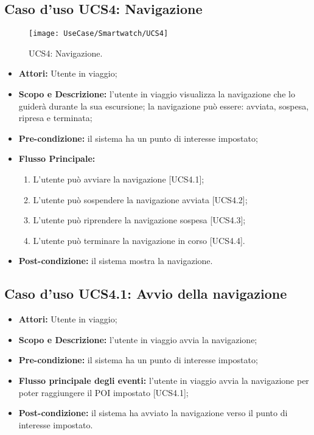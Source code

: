 \subsection{Caso d'uso UCS4: Navigazione}

\begin{figure}[H]
\centering
\texttt{[image: UseCase/Smartwatch/UCS4]}
\caption{UCS4: Navigazione.}
\end{figure}

\begin{itemize}
\item \textbf{Attori:} Utente in viaggio;
\item \textbf{Scopo e Descrizione:} l'utente in viaggio visualizza la navigazione che lo guiderà durante la sua escursione; la navigazione può essere: avviata, sospesa, ripresa e terminata;
\item \textbf{Pre-condizione:} il sistema ha un punto di interesse impostato;
\item \textbf{Flusso Principale:} 
\begin{enumerate}
\item L'utente può avviare la navigazione [UCS4.1];
\item L'utente può sospendere la navigazione avviata [UCS4.2];
\item L'utente può riprendere la navigazione sospesa [UCS4.3];
\item L'utente può terminare la navigazione in corso [UCS4.4].
\end{enumerate}
\item \textbf{Post-condizione:} il sistema mostra la navigazione.
\end{itemize}

\subsection{Caso d'uso UCS4.1: Avvio della navigazione}
\begin{itemize}
\item \textbf{Attori:} Utente in viaggio;
\item \textbf{Scopo e Descrizione:} l'utente in viaggio avvia la navigazione;
\item \textbf{Pre-condizione:} il sistema ha un punto di interesse impostato;
\item \textbf{Flusso principale degli eventi:} l'utente in viaggio avvia la navigazione per poter raggiungere il POI impostato [UCS4.1];
\item \textbf{Post-condizione:} il sistema ha avviato la navigazione verso il punto di interesse impostato.
\end{itemize}

